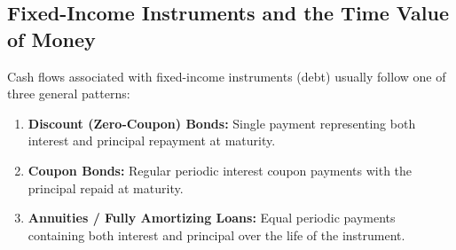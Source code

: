 

\subsection{Fixed-Income Instruments and the Time Value of Money}
	\label{subsec:Fixed-Income Instruments and the Time Value of Money}

Cash flows associated with fixed-income instruments (debt) usually follow one of three general patterns:
\begin{enumerate}
	\item \textbf{Discount (Zero-Coupon) Bonds:} Single payment representing both interest and principal repayment at maturity.
	\item \textbf{Coupon Bonds:} Regular periodic interest coupon payments with the principal repaid at maturity.
	\item \textbf{Annuities / Fully Amortizing Loans:} Equal periodic payments containing both interest and principal over the life of the instrument.
\end{enumerate}

